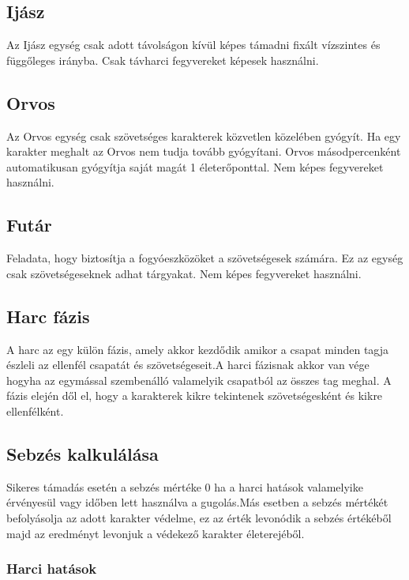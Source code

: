 \subsection{Ijász}

Az Ijász egység csak adott távolságon kívül képes támadni fixált vízszintes és függőleges irányba.
Csak távharci fegyvereket képesek használni.

\subsection{Orvos}

Az Orvos egység csak szövetséges karakterek közvetlen közelében gyógyít.
Ha egy karakter meghalt az Orvos nem tudja tovább gyógyítani.
Orvos másodpercenként automatikusan gyógyítja saját magát 1 életerőponttal.
Nem képes fegyvereket használni.

\subsection{Futár}

Feladata, hogy biztosítja a fogyóeszközöket a szövetségesek számára.
Ez az egység csak szövetségeseknek adhat tárgyakat.
Nem képes fegyvereket használni.


\subsection{Harc fázis}

A harc az egy külön fázis, amely akkor kezdődik amikor a csapat minden tagja észleli az ellenfél csapatát és szövetségeseit.A harci fázisnak akkor van vége hogyha az egymással szembenálló valamelyik csapatból az összes tag meghal. A fázis elején dől el, hogy a karakterek kikre tekintenek szövetségesként és kikre ellenfélként.

\subsection{Sebzés kalkulálása}

Sikeres támadás esetén a sebzés mértéke 0 ha a harci hatások valamelyike érvényesül vagy időben lett használva a gugolás.Más esetben a sebzés mértékét befolyásolja az adott karakter védelme, ez az érték levonódik a sebzés értékéből majd az eredményt levonjuk a védekező karakter életerejéből.

\newpage

\subsubsection{Harci hatások}


